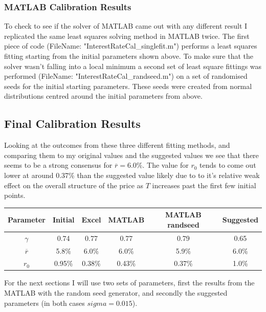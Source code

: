 \documentclass[10pt,a4paper]{article}
\theoremstyle{definition}
\theoremstyle{plain}
\theoremstyle{definition}
\theoremstyle{plain}
\begin{document}
\subsubsection{MATLAB Calibration Results}

To check to see if the solver of MATLAB came out with any different result I replicated the same least squares solving method in MATLAB twice. The first piece of code (FileName: "InterestRateCal\_singlefit.m") performs a least squares fitting starting from the initial parameters shown above. To make sure that the solver wasn't falling into a local minimum a second set of least square fittings was performed (FileName: "InterestRateCal\_randseed.m") on a set of randomised seeds for the initial starting parameters. These seeds were created from normal distributions centred around the initial parameters from above.

\subsection{Final Calibration Results}

Looking at the outcomes from these three different fitting methods, and comparing them to my original values and the suggested values we see that there seems to be a strong consensus for $\overline{r}=6.0\%$. The value for $r_{0}$ tends to come out lower at around 0.37\% than the suggested value likely due to to it's relative weak effect on the overall structure of the price as $T$ increases past the first few initial points.

\begin{center}
\begin{tabular}{c|c|c|c|c|c} 
Parameter & Initial & Excel & MATLAB & MATLAB randseed & Suggested \\ \hline
$\gamma$ & 0.74 & 0.77 & 0.77 & 0.79 & 0.65 \\
$\overline{r}$ & 5.8\% & 6.0\% & 6.0\% & 5.9\% & 6.0\% \\
$r_{0}$ & 0.95\% & 0.38\% & 0.43\% & 0.37\% & 1.0\% \\
\end{tabular}
\end{center}

For the next sections I will use two sets of parameters, first the results from the MATLAB with the random seed generator, and secondly the suggested parameters (in both cases $sigma=0.015$).
\end{document}
